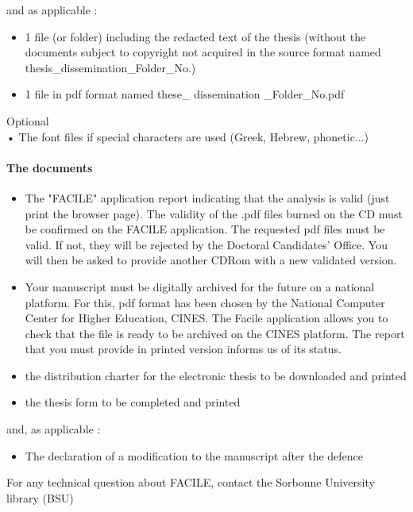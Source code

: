 and as applicable :

\begin{itemize}
    \item 1 file (or folder) including the redacted text of the thesis (without the documents subject to copyright not acquired in the source format named thesis\_dissemination\_Folder\_No.)
    \item 1 file in pdf format named these\_ dissemination \_Folder\_No.pdf
\end{itemize}

Optional\\
•    The font files if special characters are used (Greek, Hebrew, phonetic...)

\paragraph{The documents}

\begin{itemize}
    \item The "FACILE" application report indicating that the analysis is valid (just print the browser page). The validity of the .pdf files burned on the CD must be confirmed on the FACILE application. The requested pdf files must be valid. If not, they will be rejected by the Doctoral Candidates' Office. You will then be asked to provide another CDRom with a new validated version. 
    \item Your manuscript must be digitally archived for the future on a national platform. For this, pdf format has been chosen by the National Computer Center for Higher Education, CINES.  The Facile application allows you to check that the file is ready to be archived on the CINES platform. The report that you must provide in printed version informs us of its status.
    \item the distribution charter for the electronic thesis to be downloaded and printed
    \item the thesis form to be completed and printed
\end{itemize}

and, as applicable :

\begin{itemize}
    \item The declaration of a modification to the manuscript after the defence
\end{itemize}

For any technical question about FACILE, contact the Sorbonne University library (BSU)

